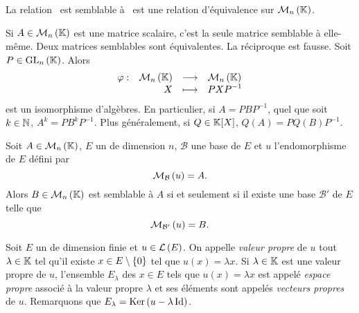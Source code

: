 \documentclass{magnolia}
\begin{document}
\begin{proposition}[utile=-3]
  La relation \flqq\ est semblable à \frqq\ est une relation d'équivalence sur
  $\mathcal{M}_{n}\left(\mathbb{K}\right)$.
  \end{proposition}


\begin{remarques}
\remarque Si $A\in\mathcal{M}_{n}\left(\mathbb{K}\right)$ est une matrice scalaire, c'est la seule
  matrice semblable à elle-même.
\remarque Deux matrices semblables sont équivalentes. La réciproque est fausse.
\remarque Soit $P\in{\rm GL}_{n}\left(\mathbb{K}\right)$. Alors
  \[\begin{array}[t]{lrcl} \displaystyle{\varphi} : & \displaystyle{\mathcal{M}_{n}\left(\ensuremath{\mathbb{K}}\right)} & \longrightarrow & \displaystyle{\mathcal{M}_{n}\left(\ensuremath{\mathbb{K}}\right)} \\ & \displaystyle{X} & \longmapsto & \displaystyle{PXP^{-1}} \end{array}\]
  est un isomorphisme d'algèbres. En particulier, si $A=PBP^{-1}$, quel que soit
  $k\in\mathbb{N}$, $A^k=PB^kP^{-1}$. Plus généralement, si $Q\in\polyK$,
  $Q(A)=PQ(B)P^{-1}$.
\end{remarques}



\begin{proposition}[utile=-3]
Soit $A\in\mathcal{M}_{n}\left(\mathbb{K}\right)$, $E$ un \Kev de dimension $n$, $\mathcal{B}$ une base de
$E$ et $u$ l'endomorphisme de $E$ défini par
\[\mathcal{M}_{\mathcal{B}}\left(u\right)=A.\]
Alors $B\in\mathcal{M}_{n}\left(\mathbb{K}\right)$ est semblable à $A$ si et seulement si il existe une
base $\mathcal{B}'$ de $E$ telle que
\[\mathcal{M}_{\mathcal{B}'}\left(u\right)=B.\]
\end{proposition}

Soit $E$ un \Kev de dimension finie et $u\in\mathcal{L}\left(E\right)$. On appelle
  \emph{valeur propre} de $u$ tout $\lambda\in\mathbb{K}$ tel qu'il existe $x\in E\setminus\left\{0\right\}$
  tel que $u(x)=\lambda x$. Si $\lambda\in\mathbb{K}$ est une valeur propre de $u$, l'ensemble
  $E_\lambda$ des $x\in E$ tels que $u(x)=\lambda x$ est appelé \emph{espace propre}
  associé à la valeur propre $\lambda$ et ses éléments sont appelés \emph{vecteurs propres} de $u$. Remarquons que
  $E_\lambda=\mathop{\rm Ker}\left(u-\lambda\operatorname{Id}\right)$.
  
\end{document}
